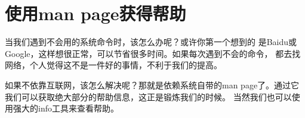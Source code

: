\section{使用man page获得帮助}
\label{sec:getHelp}

当我们遇到不会用的系统命令时，该怎么办呢？或许你第一个想到的
是Baidu或Google，这样想很正常，可以节省很多时间。如果每次遇到不会的命令，
都去找网络，个人觉得这不是一件好的事情，不利于我们的提高。

如果不依靠互联网，该怎么解决呢？那就是依赖系统自带的man page了。通过它我们可以获取绝大部分的帮助信息，这正是锻炼我们的时候。
当然我们也可以使用强大的info工具来查看帮助。
